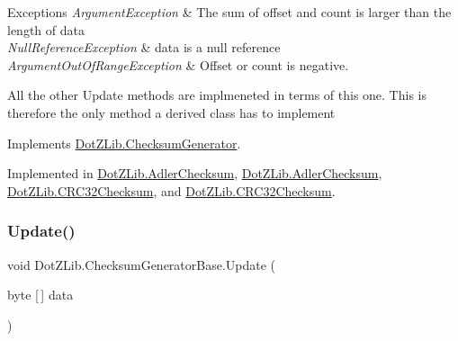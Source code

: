 \begin{DoxyExceptions}{Exceptions}
{\em Argument\+Exception} & The sum of offset and count is larger than the length of {\ttfamily data}\\
\hline
{\em Null\+Reference\+Exception} & {\ttfamily data} is a null reference\\
\hline
{\em Argument\+Out\+Of\+Range\+Exception} & Offset or count is negative.\\
\hline
\end{DoxyExceptions}


All the other {\ttfamily Update} methods are implmeneted in terms of this one. This is therefore the only method a derived class has to implement

Implements \hyperlink{interface_dot_z_lib_1_1_checksum_generator_aeba84b3ca367362cb45f4a267354b53e}{Dot\+Z\+Lib.\+Checksum\+Generator}.



Implemented in \hyperlink{class_dot_z_lib_1_1_adler_checksum_a757dd32613c477dcb7384b206b72fc34}{Dot\+Z\+Lib.\+Adler\+Checksum}, \hyperlink{class_dot_z_lib_1_1_adler_checksum_a757dd32613c477dcb7384b206b72fc34}{Dot\+Z\+Lib.\+Adler\+Checksum}, \hyperlink{class_dot_z_lib_1_1_c_r_c32_checksum_abe29e66033fa164a7c7c0463e6c88074}{Dot\+Z\+Lib.\+C\+R\+C32\+Checksum}, and \hyperlink{class_dot_z_lib_1_1_c_r_c32_checksum_abe29e66033fa164a7c7c0463e6c88074}{Dot\+Z\+Lib.\+C\+R\+C32\+Checksum}.

\mbox{\label{class_dot_z_lib_1_1_checksum_generator_base_a3fafe3e0c2fa80fb2cbbdce82a76bc84}} 
\subsubsection{\texorpdfstring{Update()}{Update()}\hspace{0.1cm}{\footnotesize\ttfamily [3/8]}}
{\footnotesize\ttfamily void Dot\+Z\+Lib.\+Checksum\+Generator\+Base.\+Update (\begin{DoxyParamCaption}\item[{byte \mbox{[}$\,$\mbox{]}}]{data }\end{DoxyParamCaption})\hspace{0.3cm}{\ttfamily [inline]}}



